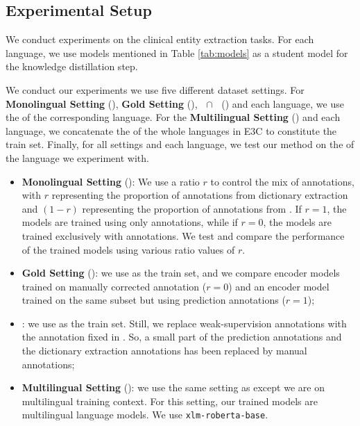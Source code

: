 \subsection{Experimental Setup} 
\label{sec:prot}
We conduct experiments on the clinical entity extraction tasks. For each language, we use models mentioned in Table \ref{tab:models} as a student model for the knowledge distillation step.
\begin{table}
    \centering
    \small
    \resizebox{1\columnwidth}{!}{
        
    }
    \caption{The models used for each language during our experiments. We mention in this table the name of the model in the huggingface model repository}
    \label{tab:models}
\end{table}
We conduct our experiments we use five different dataset settings. For \textbf{Monolingual Setting} (\SettingD), \textbf{Gold Setting} (\SettingB), \textbf{\SettingD~$\cap$~\SettingB} (\SettingC) and each language, we use the \layerTwo of the corresponding language. For the \textbf{Multilingual Setting} (\SettingE) and each language, we concatenate the \layerTwo of the whole languages in E3C to constitute the train set. Finally, for all settings and each language, we test our method on the \layerOne of the language we experiment with.
\begin{itemize}
    \item \textbf{Monolingual Setting} (\SettingD): We use a ratio $r$ to control the mix of annotations, with $r$ representing the proportion of annotations from dictionary extraction and $(1-r)$ representing the proportion of annotations from \instruct. If $r=1$, the models are trained using only \instruct annotations, while if $r=0$, the models are trained exclusively with \dict annotations. We test and compare the performance of the trained models using various ratio values of $r$. 
    \item \textbf{Gold Setting} (\SettingB): we use \layerValidate\space as the train set, and we compare encoder models trained on manually corrected annotation ($r=0$) and an encoder model trained on the same subset but using \instruct prediction annotations ($r=1$);
    \item \SettingC :  we use \layerTwo as the train set. Still, we replace weak-supervision annotations with the annotation fixed in \layerValidate. So, a small part of the \instruct prediction annotations and the dictionary extraction annotations has been replaced by manual annotations;
    \item \textbf{Multilingual Setting} (\SettingE): we use the same setting as \SettingD except we are on multilingual training context. For this setting, our trained models are multilingual language models. We use \verb|xlm-roberta-base|. 
\end{itemize}

